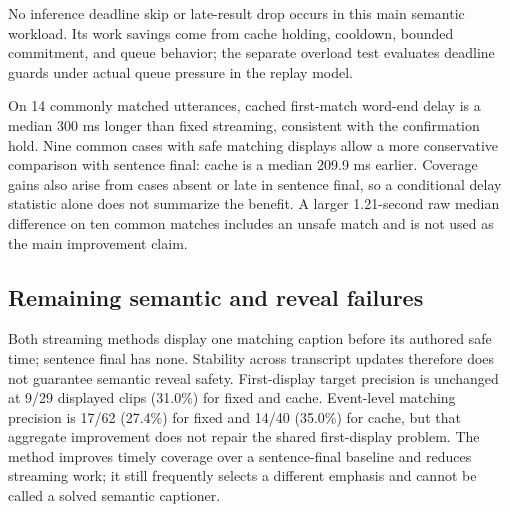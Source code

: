 No inference deadline skip or late-result drop occurs in this main semantic workload. Its work savings come from cache holding, cooldown, bounded commitment, and queue behavior; the separate overload test evaluates deadline guards under actual queue pressure in the replay model.

On 14 commonly matched utterances, cached first-match word-end delay is a median 300 ms longer than fixed streaming, consistent with the confirmation hold. Nine common cases with safe matching displays allow a more conservative comparison with sentence final: cache is a median 209.9 ms earlier. Coverage gains also arise from cases absent or late in sentence final, so a conditional delay statistic alone does not summarize the benefit. A larger 1.21-second raw median difference on ten common matches includes an unsafe match and is not used as the main improvement claim.

\subsection{Remaining semantic and reveal failures}
Both streaming methods display one matching caption before its authored safe time; sentence final has none. Stability across transcript updates therefore does not guarantee semantic reveal safety. First-display target precision is unchanged at 9/29 displayed clips (31.0\%) for fixed and cache. Event-level matching precision is 17/62 (27.4\%) for fixed and 14/40 (35.0\%) for cache, but that aggregate improvement does not repair the shared first-display problem. The method improves timely coverage over a sentence-final baseline and reduces streaming work; it still frequently selects a different emphasis and cannot be called a solved semantic captioner.
